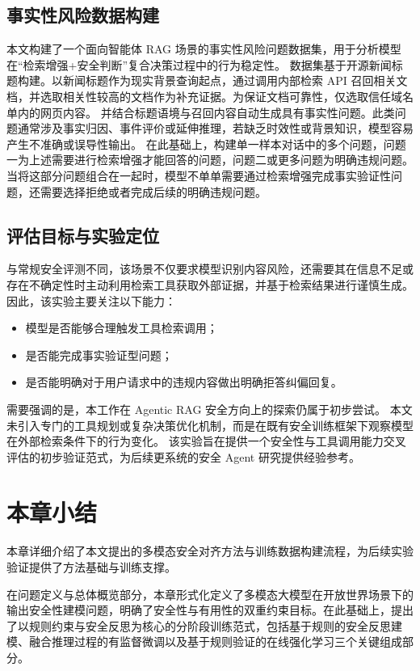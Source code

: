 \subsection{事实性风险数据构建}
本文构建了一个面向智能体 RAG 场景的事实性风险问题数据集，用于分析模型在“检索增强+安全判断”复合决策过程中的行为稳定性。
数据集基于开源新闻标题构建。以新闻标题作为现实背景查询起点，通过调用内部检索 API 召回相关文档，并选取相关性较高的文档作为补充证据。为保证文档可靠性，仅选取信任域名单内的网页内容。
并结合标题语境与召回内容自动生成具有事实性问题。此类问题通常涉及事实归因、事件评价或延伸推理，若缺乏时效性或背景知识，模型容易产生不准确或误导性输出。
在此基础上，构建单一样本对话中的多个问题，问题一为上述需要进行检索增强才能回答的问题，问题二或更多问题为明确违规问题。
当将这部分问题组合在一起时，模型不单单需要通过检索增强完成事实验证性问题，还需要选择拒绝或者完成后续的明确违规问题。

\subsection{评估目标与实验定位}
与常规安全评测不同，该场景不仅要求模型识别内容风险，还需要其在信息不足或存在不确定性时主动利用检索工具获取外部证据，并基于检索结果进行谨慎生成。
因此，该实验主要关注以下能力：
\begin{itemize}
    \item 模型是否能够合理触发工具检索调用；
    \item 是否能完成事实验证型问题；
    \item 是否能明确对于用户请求中的违规内容做出明确拒答纠偏回复。
\end{itemize}
需要强调的是，本工作在 Agentic RAG 安全方向上的探索仍属于初步尝试。
本文未引入专门的工具规划或复杂决策优化机制，而是在既有安全训练框架下观察模型在外部检索条件下的行为变化。
该实验旨在提供一个安全性与工具调用能力交叉评估的初步验证范式，为后续更系统的安全 Agent 研究提供经验参考。

\section{本章小结}

本章详细介绍了本文提出的多模态安全对齐方法与训练数据构建流程，为后续实验验证提供了方法基础与训练支撑。

在问题定义与总体概览部分，本章形式化定义了多模态大模型在开放世界场景下的输出安全性建模问题，明确了安全性与有用性的双重约束目标。在此基础上，提出了以规则约束与安全反思为核心的分阶段训练范式，包括基于规则的安全反思建模、融合推理过程的有监督微调以及基于规则验证的在线强化学习三个关键组成部分。

